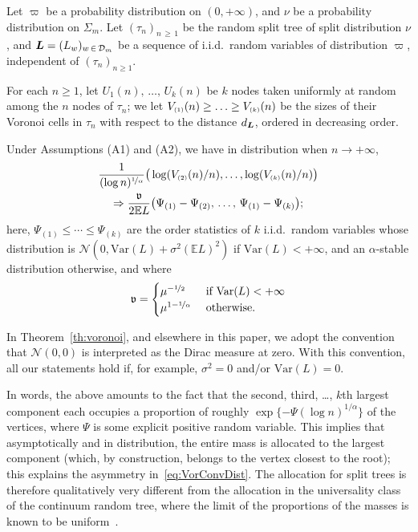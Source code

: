 \documentclass[AHL,Unicode,longabstracts,published]{cedram}
\newcommand{\bs}{\ensuremath{\boldsymbol}}
\newcommand{\sss}{\ensuremath{\scriptscriptstyle}}
\newcommand{\bbE}{\mathbb{E}}
\newcommand{\clD}{\mathcal{D}}
\newcommand{\clN}{\mathcal{N}}
\newcommand{\Var}{\mathrm{Var}}
\newcommand{\frkv}{\mathfrak{v}}
\begin{document}
\begin{theo}\label{th:voronoi}
Let $\varpi$ be a probability distribution on $(0,+\infty)$, and $\nu$ be a probability distribution on $\Sigma_m$. Let $(\tau_n)_{n\,\geq\,1}$ be the random split tree of split distribution $\nu$, and $\bs L = (L_w)_{w\,\in\,\clD_m}$ be a sequence of i.i.d.\ random variables of distribution $\varpi$, independent of $(\tau_n)_{n\geq 1}$.

For each $n\geq 1$, let $U_1(n),\,\ldots,\,U_k(n)$ be $k$ nodes taken uniformly at random among the $n$ nodes of $\tau_n$; we let $V_{\sss (1)}(n)\geq \ldots \geq V_{\sss (k)}(n)$ be the sizes of their Voronoi cells in $\tau_n$ with respect to the distance $d_{\bs L}$, ordered in decreasing order.

Under Assumptions {\rm (A1)} and {\rm (A2)}, we have in distribution when $n\to+\infty$,
\begin{multline}\label{eq:VorConvDist}
\frac1{(\log n)^{\nicefrac1\alpha}}\big(\log (V_{\sss (2)}(n)/n), \ldots, \log (V_{\sss (k)}(n)/n)\big)\\ \Rightarrow
\frac{\frkv}{2\bbE L}
\big(\Psi_{(1)}-\Psi_{(2)}, \,\ldots,\, \Psi_{(1)}-\Psi_{(k)}\big);
\end{multline}
here, $\Psi_{(1)}\leq \cdots\leq \Psi_{(k)}$ are the order statistics of $k$ i.i.d.\ random variables whose distribution is $\clN(0, \Var(L) + \sigma^2 (\bbE L)^2)$ if $\Var(L)<+\infty$, and an $\alpha$-stable distribution otherwise, and where
\begin{equation}\label{eq:def_frak_v}
\frkv =
\begin{cases}
\mu^{-\nicefrac12} & \text{ if }\Var(L)<+\infty\\
\mu^{1-\nicefrac1\alpha} &\text{ otherwise.}
\end{cases}
\end{equation}
\end{theo}

\begin{rema}
In Theorem~\ref{th:voronoi}, and elsewhere in this paper, we adopt the convention that $\clN(0,0)$ is interpreted as the Dirac measure at zero. With this convention, all our statements hold if, for example, $\sigma^2 = 0$ and/or $\Var(L)=0$.
\end{rema}

In words, the above amounts to the fact that the second, third, \dots, $k$th largest component each occupies a proportion of roughly $\exp\{-\Psi(\log n)^{1/\alpha}\}$ of the vertices, where $\Psi$ is some explicit positive random variable. This implies that asymptotically and in distribution, the entire mass is allocated to the largest component (which, by construction, belongs to the vertex closest to the root); this explains the asymmetry in~\eqref{eq:VorConvDist}. The allocation for split trees is therefore qualitatively very different from the allocation in the universality class of the continuum random tree, where the limit of the proportions of the masses is known to be uniform~\cite{Chapuy}.
\end{document}
